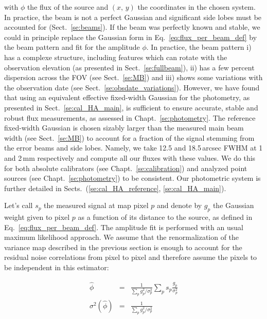 with $\phi$ the flux of the source and $(x,\, y)$ the coordinates in
the chosen system. In practice, the beam is not a perfect Gaussian
and significant side lobes must be accounted for
(Sect.~\ref{se:beams}). If the beam was perfectly known and stable, we could in
principle replace the Gaussian form in Eq.~\ref{eq:flux_per_beam_def} by the
beam pattern and fit for the amplitude $\phi$.
In practice, the beam pattern i) has a complexe structure, including
features which can rotate with the observation elevation (as presented
in Sect.~\ref{se:fullbeam}), ii) has a few percent dispersion across the FOV (see
Sect.~\ref{se:MB}) and iii) shows some variations with the observation date
(see Sect.~\ref{se:obsdate_variations}). However, we have found that using an equivalent
effective fixed-width Gaussian for the photometry, as presented in
Sect.~\ref{se:cal_HA_main}, is sufficient to ensure accurate, stable and robust flux
measurements, as assessed in Chapt.~\ref{se:photometry}. The reference fixed-width
Gaussian is chosen sizably larger than the measured main beam width
(see Sect.~\ref{se:MB}) to account for a fraction of the
signal stemming from the error beams and side lobes. Namely, we take
12.5 and 18.5\,arcsec FWHM at 1 and 2\,mm respectively and compute all our fluxes with these
values. We do this for both absolute calibrators (see Chapt.~\ref{se:calibration})
and analyzed point sources (see Chapt.~\ref{se:photometry}) to be consistent. Our
photometric system is further detailed in Sects.~(\ref{se:cal_HA_reference}, \ref{se:cal_HA_main}).


Let's call $s_p$ the measured signal at map pixel $p$ and denote by $g_p$ the
Gaussian weight given to pixel $p$ as a function of its distance to the source,
as defined in Eq.~\ref{eq:flux_per_beam_def}. The amplitude fit is performed
with an usual maximum likelihood approach. We assume that the renormalization of
the variance map described in the previous section is enough to account for the
residual noise correlations from pixel to pixel and therefore assume the pixels to
be independent in this estimator:

\begin{eqnarray}
\hat{\phi} &=& \frac{1}{\sum_p g_p^2/\sigma_p^2}\sum_p
s_p\frac{g_p}{\sigma_p^2} \label{eq:flux_estim_def} \\
\sigma^2(\hat{\phi}) &=& \frac{1}{\sum_p
  g_p^2/\sigma_p^2} \label{eq:flux_estim_var_def}
\end{eqnarray}

